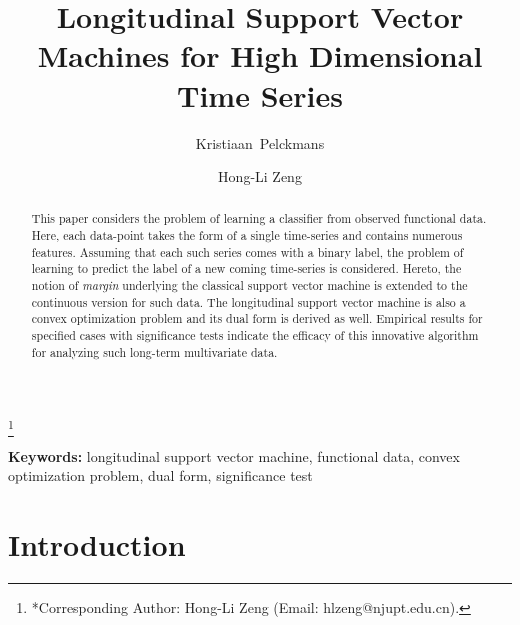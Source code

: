\documentclass[12pt,a4paper]{article}%
\begin{document}
\title{Longitudinal Support Vector Machines for High Dimensional Time Series}

\author[1]{Kristiaan~Pelckmans}
\author[2,3,*]{Hong-Li Zeng}
\date{}
\maketitle


\let\thefootnote\relax\footnote{*Corresponding Author: Hong-Li Zeng (Email: hlzeng@njupt.edu.cn).}




\begin{abstract}
	This paper considers the problem of learning a classifier from observed functional data.
	Here, each data-point takes the form of a single time-series and contains numerous features.
	Assuming that each such series comes with a binary label, the problem of learning to predict the label of a new coming time-series is considered.
	Hereto, the notion of {\em margin} underlying the classical support vector machine is extended to the continuous version for such data.
	The longitudinal support vector machine is also a convex optimization problem and its dual form is derived as well.
	Empirical results for specified cases with significance tests indicate the efficacy of this innovative algorithm for analyzing such long-term multivariate data.
\end{abstract}

{\bf Keywords:} longitudinal support vector machine, functional data, convex optimization problem, dual form, significance test




\section{Introduction}
\end{document}
